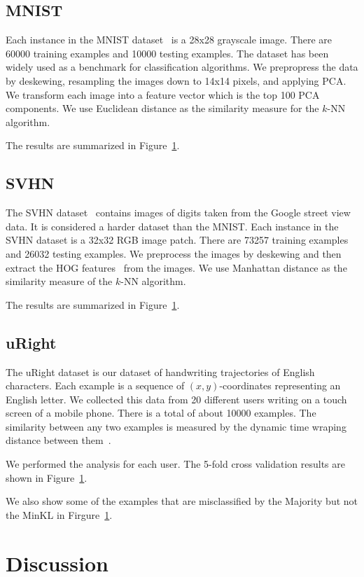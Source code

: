 \documentclass{article}
\begin{document}
\subsection{MNIST}
Each instance in the MNIST dataset~\cite{} is a 28x28 grayscale image. There
are 60000 training examples and 10000 testing examples. The dataset
has been widely used as a benchmark for classification algorithms. We
prepropress the data by deskewing, resampling the images down to
14x14 pixels, and applying PCA. We transform each image into a feature
vector which is the top 100 PCA components. We use Euclidean distance
as the similarity measure for the $k$-NN algorithm.

The results are summarized in Figure~\ref{}. 

\subsection{SVHN}
The SVHN dataset~\cite{} contains images of digits taken from the Google
street view data. It is considered a harder dataset than the
MNIST. Each instance in the SVHN dataset is a 32x32 RGB image
patch. There are 73257 training examples and 26032 testing
examples. We preprocess the images by deskewing and then extract the
HOG features~\cite{} from the images. We use Manhattan distance as the
similarity measure of the $k$-NN algorithm.

The results are summarized in Figure~\ref{}.

\subsection{uRight}
The uRight dataset is our dataset of handwriting trajectories of
English characters. Each example is a sequence of $(x,y)$-coordinates
representing an English letter. We collected this data from 20
different users writing on a touch screen of a mobile phone. There is
a total of about 10000 examples. The similarity between any two
examples is measured by the dynamic time wraping distance between
them~\cite{}.

We performed the analysis for each user. The 5-fold cross validation
results are shown in Figure~\ref{}.

We also show some of the examples that are misclassified by the
Majority but not the MinKL in Firgure~\ref{}.


\section{Discussion}
\end{document}
